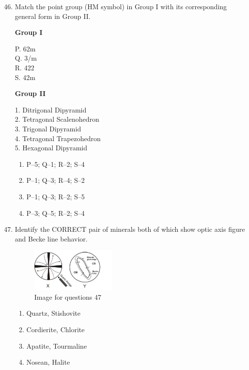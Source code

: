 \documentclass[journal,12pt,onecolumn]{IEEEtran}
\theoremstyle{remark}
\begin{document}
\begin{enumerate}
\setcounter{enumi}{45}

\item Match the point group (HM symbol) in Group I with its corresponding general form in Group II.

\begin{multicols}{2}
\textbf{Group I}  
\begin{flushleft}
P. 62m\\
Q. 3/m\\
R. 422\\
S. 42m
\end{flushleft}

\columnbreak

\textbf{Group II}  
\begin{flushleft}
1. Ditrigonal Dipyramid\\
2. Tetragonal Scalenohedron\\
3. Trigonal Dipyramid\\
4. Tetragonal Trapezohedron\\
5. Hexagonal Dipyramid
\end{flushleft}
\end{multicols}

\begin{multicols}{2}
\begin{enumerate}
\item P--5; Q--1; R--2; S--4  
\item P--1; Q--3; R--4; S--2  
\item P--1; Q--3; R--2; S--5  
\item P--3; Q--5; R--2; S--4  
\end{enumerate}
\end{multicols}

\item Identify the CORRECT pair of minerals both of which show optic axis figure and Becke line behavior.  
\begin{figure}[H]
    \centering
    \includegraphics[width=0.4\textwidth]{figs/fig10.png}
    \caption{Image for questions 47}
    \label{fig:question47}
\end{figure}

\begin{multicols}{2}
\begin{enumerate}
\item Quartz, Stishovite  
\item Cordierite, Chlorite  
\item Apatite, Tourmaline  
\item Nosean, Halite  
\end{enumerate}
\end{multicols}


\end{enumerate}
\end{document}

